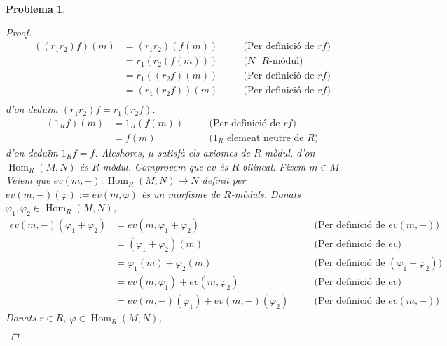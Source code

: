 \documentclass[compress]{article}
\newtheorem{problema}{Problema}
\theoremstyle{definition}
\DeclareMathOperator{\Hom}{Hom}
\begin{document}
\begin{problema}
\begin{enumerate}
\begin{proof}
             \begin{align*}
                 ((r_{1}r_{2})f)(m)
                 &=(r_{1}r_{2})(f(m))
                 &\quad&\textrm{(Per definició de $rf$)}\\
                 &=r_{1}(r_{2}(f(m)))
                 &\quad&\textrm{($N$ $R$-mòdul)}\\
                 &=r_{1}((r_{2}f)(m))
                 &\quad&\textrm{(Per definició de $rf$)}\\
                 &=(r_{1}(r_{2}f))(m)
                 &\quad&\textrm{(Per definició de $rf$)}\\
             \end{align*}
             d'on deduïm $(r_{1}r_{2})f=r_{1}(r_{2}f)$.
             \begin{align*}
                 (1_{R}f)(m)
                 &=1_{R}(f(m))
                 &\quad&\textrm{(Per definició de $rf$)}\\
                 &=f(m)
                 &\quad&\textrm{($1_{R}$ element neutre de $R$)}
             \end{align*}
             d'on deduïm $1_{R}f=f$. Aleshores, $\mu$ satisfà els axiomes de $R$-mòdul, d'on $\Hom_{R}(M,N)$ és $R$-mòdul.\newline
             Comprovem que $ev$ és $R$-bilineal. Fixem $m\in M$. Veiem que $ev(m,-):\Hom_{R}(M,N)\rightarrow N$ definit per $ev(m,-)(\varphi):=ev(m,\varphi)$ és un morfisme de $R$-mòduls. Donats $\varphi_{1},\varphi_{2}\in\Hom_{R}(M,N)$,
             \begin{align*}
                 ev(m,-)(\varphi_{1}+\varphi_{2})
                 &=ev(m,\varphi_{1}+\varphi_{2})
                 &\quad&\textrm{(Per definició de $ev(m,-)$)}\\
                 &=(\varphi_{1}+\varphi_{2})(m)
                 &\quad&\textrm{(Per definició de $ev$)}\\
                 &=\varphi_{1}(m)+\varphi_{2}(m)
                 &\quad&\textrm{(Per definició de $(\varphi_{1}+\varphi_{2})$)}\\
                 &=ev(m,\varphi_{1})+ev(m,\varphi_{2})
                 &\quad&\textrm{(Per definició de $ev$)}\\
                 &=ev(m,-)(\varphi_{1})+ev(m,-)(\varphi_{2})
                 &\quad&\textrm{(Per definició de $ev(m,-)$)}
             \end{align*}
             Donats $r\in R$, $\varphi\in\Hom_{R}(M,N)$,
             \begin{align*}

\end{align*}
\end{proof}
\end{enumerate}
\end{problema}
\end{document}
